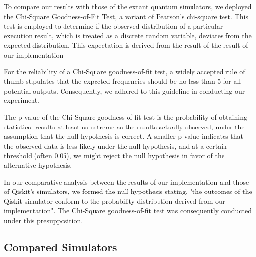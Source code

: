 \documentclass[10pt,a4paper]{article}
\newcommand{\<}{\langle}
\renewcommand{\>}{\rangle}
\begin{document}
To compare our results with those of the extant quantum simulators, we deployed the Chi-Square
Goodness-of-Fit Test, a variant of Pearson's chi-square test. This test is employed to determine if
the observed distribution of a particular execution result, which is treated as a discrete random
variable, deviates from the expected distribution. This expectation is derived from the result of
the result of our implementation.

For the reliability of a Chi-Square goodness-of-fit test, a widely accepted rule of thumb stipulates
that the expected frequencies should be no less than 5 for all potential outputs. Consequently, we
adhered to this guideline in conducting our experiment.

The p-value of the Chi-Square goodness-of-fit test is the probability of obtaining statistical results at
least as extreme as the results actually observed, under the assumption that the null hypothesis is
correct. A smaller p-value indicates that the observed data is less likely under the null
hypothesis, and at a certain threshold (often 0.05), we might reject the null hypothesis in favor of
the alternative hypothesis.

In our comparative analysis between the results of our implementation and those of Qiskit's
simulators, we formed the null hypothesis stating, "the outcomes of the Qiskit simulator conform to
the probability distribution derived from our implementation". The Chi-Square goodness-of-fit test
was consequently conducted under this presupposition.

\subsection{Compared Simulators}
\end{document}
